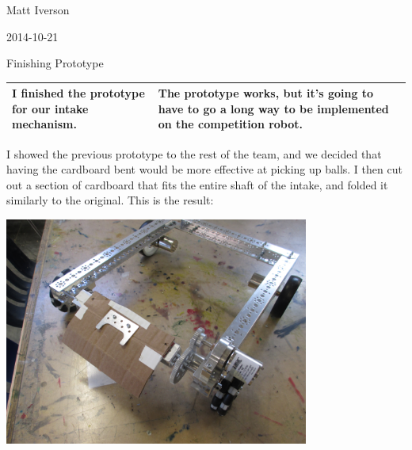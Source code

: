 Matt Iverson

2014-10-21

Finishing Prototype

\begin{tabular}{|p{5cm}|p{5cm}|}
 \hline
 I finished the prototype for our intake mechanism.
 &
 The prototype works, but it’s going to have to go a long way to be implemented on the competition robot.
 \\
 \hline
\end{tabular}

I showed the previous prototype to the rest of the team, and we decided that having the cardboard bent would be more effective at picking up balls. I then cut out a section of cardboard that fits the entire shaft of the intake, and folded it similarly to the original. This is the result:

\begin{center}
 \includegraphics[width=10cm]{./Entries/Images/IMG_0016.JPG}
\end{center}

